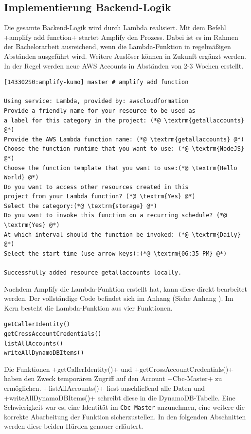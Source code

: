 \subsection{Implementierung Backend-Logik}
\label{ImpLambda}
Die gesamte Backend-Logik wird durch Lambda realisiert.
Mit dem Befehl \spverb+amplify add function+ startet Amplify den Prozess.
Dabei ist es im Rahmen der Bachelorarbeit ausreichend, wenn die Lambda-Funktion in regelmäßigen Abständen ausgeführt wird.
Weitere Auslöser können in Zukunft ergänzt werden.
In der Regel werden neue AWS Accounts in Abständen von 2-3 Wochen erstellt.
\\
\begin{lstlisting}[basicstyle=\ttfamily\small, breaklines=true , frame = single, backgroundcolor=\color{flashwhite} ]
[143302S0:amplify-kumo] master # amplify add function

Using service: Lambda, provided by: awscloudformation
Provide a friendly name for your resource to be used as
a label for this category in the project: (*@ \textrm{getallaccounts} @*)
Provide the AWS Lambda function name: (*@ \textrm{getallaccounts} @*)
Choose the function runtime that you want to use: (*@ \textrm{NodeJS} @*)
Choose the function template that you want to use:(*@ \textrm{Hello World} @*)
Do you want to access other resources created in this
project from your Lambda function? (*@ \textrm{Yes} @*)
Select the category:(*@ \textrm{storage} @*)
Do you want to invoke this function on a recurring schedule? (*@ \textrm{Yes} @*)
At which interval should the function be invoked: (*@ \textrm{Daily} @*)
Select the start time (use arrow keys):(*@ \textrm{06:35 PM} @*)

Successfully added resource getallaccounts locally.
\end{lstlisting}

\clearpage
Nachdem Amplify die Lambda-Funktion erstellt hat, kann diese direkt bearbeitet werden.
Der vollständige Code befindet sich im Anhang (Siehe Anhang \textit{}).
Im Kern besteht die Lambda-Funktion aus vier Funktionen.
\\

\begin{lstlisting}[basicstyle=\ttfamily\small, breaklines=true , frame = single, backgroundcolor=\color{flashwhite} ]
getCallerIdentity()
getCrossAccountCredentials()
listAllAccounts()
writeAllDynamoDBItems()
\end{lstlisting}


Die Funktionen \spverb+getCallerIdentity()+ und \spverb+getCrossAccountCredentials()+ haben den Zweck temporären Zugriff auf den Account \spverb+Cbc-Master+ zu ermöglichen.
\spverb+listAllAccounts()+ liest anschließend alle Daten und \spverb+writeAllDynamoDBItems()+ schreibt diese in die DynamoDB-Tabelle.
Eine Schwierigkeit war es, eine Identität im \verb+Cbc-Master+ anzunehmen, eine weitere die korrekte Abarbeitung der Funktion sicherzustellen.
In den folgenden Abschnitten werden diese beiden Hürden genauer erläutert.

